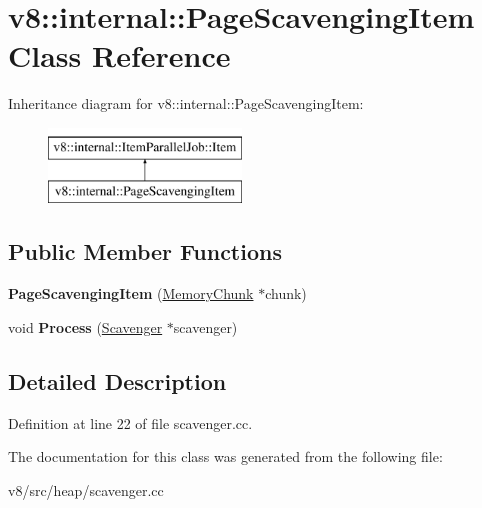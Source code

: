 \hypertarget{classv8_1_1internal_1_1PageScavengingItem}{}\section{v8\+:\+:internal\+:\+:Page\+Scavenging\+Item Class Reference}
\label{classv8_1_1internal_1_1PageScavengingItem}
Inheritance diagram for v8\+:\+:internal\+:\+:Page\+Scavenging\+Item\+:\begin{figure}[H]
\begin{center}
\leavevmode
\includegraphics[height=2.000000cm]{classv8_1_1internal_1_1PageScavengingItem}
\end{center}
\end{figure}
\subsection*{Public Member Functions}
\begin{DoxyCompactItemize}
\item 
\mbox{\label{classv8_1_1internal_1_1PageScavengingItem_aa30390847c85fac0763ca826a8e994a4}} 
{\bfseries Page\+Scavenging\+Item} (\mbox{\hyperlink{classv8_1_1internal_1_1MemoryChunk}{Memory\+Chunk}} $\ast$chunk)
\item 
\mbox{\label{classv8_1_1internal_1_1PageScavengingItem_ae0da15b508213cdd40e85691ac8f8034}} 
void {\bfseries Process} (\mbox{\hyperlink{classv8_1_1internal_1_1Scavenger}{Scavenger}} $\ast$scavenger)
\end{DoxyCompactItemize}


\subsection{Detailed Description}


Definition at line 22 of file scavenger.\+cc.



The documentation for this class was generated from the following file\+:\begin{DoxyCompactItemize}
\item 
v8/src/heap/scavenger.\+cc\end{DoxyCompactItemize}
